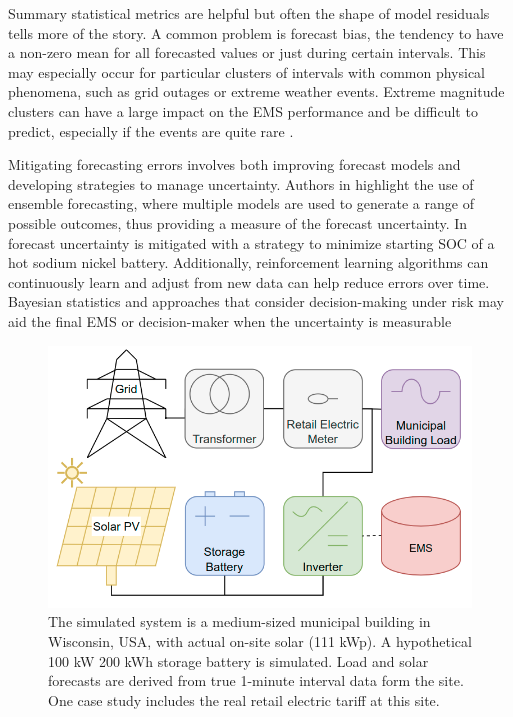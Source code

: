 \documentclass[conference]{IEEEtran}
\begin{document}
Summary statistical metrics are helpful but often the shape of model residuals tells more of the story. A common problem is forecast bias, the tendency to have a non-zero mean for all forecasted values or just during certain intervals. This may especially occur for particular clusters of intervals with common physical phenomena, such as grid outages or extreme weather events. Extreme magnitude clusters can have a large impact on the EMS performance and be difficult to predict, especially if the events are quite rare \cite{b10}.

Mitigating forecasting errors involves both improving forecast models and developing strategies to manage uncertainty. Authors in \cite{b6} highlight the use of ensemble forecasting, where multiple models are used to generate a range of possible outcomes, thus providing a measure of the forecast uncertainty. In \cite{b6i} forecast uncertainty is mitigated with a strategy to minimize starting SOC of a hot sodium nickel battery. Additionally, reinforcement learning algorithms can continuously learn and adjust from new data can help reduce errors over time. Bayesian statistics and approaches that consider decision-making under risk may aid the final EMS or decision-maker when the uncertainty is measurable \cite{b11} 

\begin{figure}
    \centering
    \includegraphics[width=.87\linewidth]{one-line.png}
    \caption{The simulated system is a medium-sized municipal building in Wisconsin, USA, with actual on-site solar (111 kWp). A hypothetical 100 kW 200 kWh storage battery is simulated. Load and solar forecasts are derived from true 1-minute interval data form the site. One case study includes the real retail electric tariff at this site.}
    \label{fig:one-line}
\end{figure}
\end{document}
